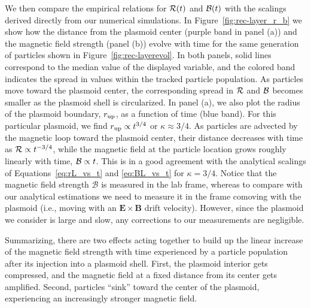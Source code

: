 We then compare the empirical relations for $\mathcal{R}(t)$ and $\mathcal{B}(t)$ with the scalings derived directly from our numerical simulations. In Figure~\ref{fig:rec-layer_r_b} we show how the distance from the plasmoid center (purple band in panel (a)) and the magnetic field strength (panel (b)) evolve with time for the same generation of particles shown in Figure~\ref{fig:rec-layerevol}. In both panels, solid lines correspond to the median value of the displayed variable, and the colored band indicates the spread in values within the tracked particle population. As particles move toward the plasmoid center, the corresponding spread in $\mathcal{R}$ and $\mathcal{B}$ becomes smaller as the plasmoid shell is circularized. In panel (a), we also plot the radius of the plasmoid boundary, $r_{\rm up}$, as a function of time (blue band). For this particular plasmoid, we find $r_{\rm up}\propto t^{3/4}$ or $\kappa\approx 3/4$. As particles are advected by the magnetic loop toward the plasmoid center, their distance decreases with time as $\mathcal{R}\propto t^{-3/4}$, while the magnetic field at the particle location grows roughly linearly with time, $\mathcal{B}\propto t$. This is in a good agreement with the analytical scalings of Equations~\eqref{eq:rL_vs_t} and \eqref{eq:BL_vs_t} for $\kappa=3/4$. Notice that the magnetic field strength $\mathcal{B}$ is measured in the lab frame, whereas to compare with our analytical estimations we need to measure it in the frame comoving with the plasmoid (i.e., moving with an $\boldsymbol{E}\times\boldsymbol{B}$ drift velocity). However, since the plasmoid we consider is large and slow, any corrections to our measurements are negligible.

Summarizing, there are two effects acting together to build up the linear increase of the magnetic field strength with time experienced by a particle population after its injection into a plasmoid shell. First, the plasmoid interior gets compressed, and the magnetic field at a fixed distance from its center gets amplified. Second, particles ``sink'' toward the center of the plasmoid, experiencing an increasingly stronger magnetic field. 

